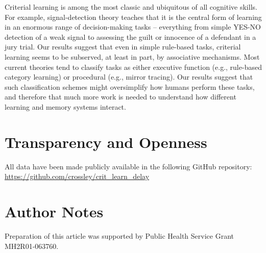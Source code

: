 \documentclass[doc, floatsintext]{apa7}
\begin{document}
Criterial learning is among the most classic and ubiquitous
of all cognitive skills. For example, signal-detection
theory teaches that it is the central form of learning in an
enormous range of decision-making tasks -- everything from
simple YES-NO detection of a weak signal to assessing the
guilt or innocence of a defendant in a jury trial. Our
results suggest that even in simple rule-based tasks,
criterial learning seems to be subserved, at least in part,
by associative mechanisms. Most current theories tend to
classify tasks as either executive function (e.g.,
rule-based category learning) or procedural (e.g., mirror
tracing). Our results suggest that such classification
schemes might oversimplify how humans perform these tasks,
and therefore that much more work is needed to understand
how different learning and memory systems interact.

\section{Transparency and Openness}
All data have been made publicly available in the following
GitHub repository:
\url{https://github.com/crossley/crit_learn_delay}

\section{Author Notes}
Preparation of this article was supported by Public Health
Service Grant MH2R01-063760.

\printbibliography
\end{document}
